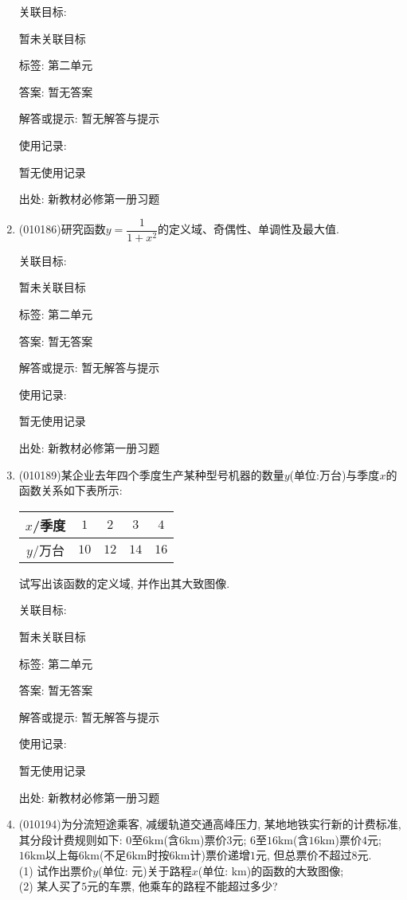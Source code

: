 \documentclass[10pt,a4paper]{article}
\begin{document}
\begin{enumerate}[1.]
关联目标:

暂未关联目标



标签: 第二单元

答案: 暂无答案

解答或提示: 暂无解答与提示

使用记录:

暂无使用记录


出处: 新教材必修第一册习题
\item { (010186)}研究函数$y=\dfrac1{1+x^2}$的定义域、奇偶性、单调性及最大值.


关联目标:

暂未关联目标



标签: 第二单元

答案: 暂无答案

解答或提示: 暂无解答与提示

使用记录:

暂无使用记录


出处: 新教材必修第一册习题
\item { (010189)}某企业去年四个季度生产某种型号机器的数量$y$(单位:万台)与季度$x$的函数关系如下表所示:
\begin{center}
\begin{tabular}{|c|c|c|c|c|}
\hline
$x$/季度 & $1$ & $2$ & $3$ & $4$ \\ \hline
$y$/万台 & $10$ & $12$ & $14$ & $16$ \\ \hline
\end{tabular}
\end{center}
试写出该函数的定义域, 并作出其大致图像.


关联目标:

暂未关联目标



标签: 第二单元

答案: 暂无答案

解答或提示: 暂无解答与提示

使用记录:

暂无使用记录


出处: 新教材必修第一册习题
\item { (010194)}为分流短途乘客, 减缓轨道交通高峰压力, 某地地铁实行新的计费标准, 其分段计费规则如下: $0$至$6\text{km}$(含$6\text{km}$)票价$3$元; $6$至$16\text{km}$(含$16\text{km}$)票价$4$元; $16\text{km}$以上每$6\text{km}$(不足$6\text{km}$时按$6\text{km}$计)票价递增$1$元, 但总票价不超过$8$元.\\
(1) 试作出票价$y$(单位: 元)关于路程$x$(单位: $\text{km}$)的函数的大致图像;\\
(2) 某人买了$5$元的车票, 他乘车的路程不能超过多少?



\end{enumerate}
\end{document}
